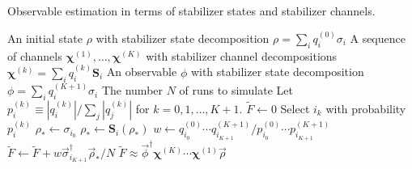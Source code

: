 \documentclass[twocolumn,pra]{revtex4}
\newcommand{\bs}[1]{\boldsymbol{#1}}
\begin{document}
\begin{algorithm}
\caption{Observable estimation in terms of stabilizer states and stabilizer channels.}
\label{alg:simulation algorithm}
\begin{algorithmic}
\Require An initial state $\rho$ with stabilizer state decomposition $\rho=\sum_{i} q_{i}^{(0)} \sigma_{i}$
\Require A sequence of channels $\bs{\chi}^{(1)}, \ldots, \bs{\chi}^{(K)}$  with stabilizer channel decompositions $\bs{\chi}^{(k)}=\sum_{i} q_{i}^{(k)}\mathbf{S}_{i}$
\Require An observable $\phi$ with stabilizer state decomposition $\phi=\sum_{i} q_{i}^{(K+1)} \sigma_{i}$
\Require The number $N$ of runs to simulate
\State Let $p^{(k)}_i \equiv | q^{(k)}_i|/ \sum_j | q^{(k)}_j|$ for $k=0,1,\ldots,K+1$.
\State  $\tilde{F} \leftarrow 0$
		\State Select $i_k$ with probability $p^{(k)}_i$
	\EndFor
	\State $\rho_{*} \leftarrow \sigma_{i_0}$
		\State $\rho_{*} \leftarrow \bs{S}_i(\rho_{*})$
	\EndFor
	\State $w \leftarrow  q^{(0)}_{i_0} \cdots  q^{(K+1)}_{i_{K+1}} / p^{(0)}_{i_0} \cdots p^{(K+1)}_{i_{K+1}}$
	\State $\tilde{F} \leftarrow \tilde{F} + w \vec{\sigma}_{i_{K+1}}^\dagger \vec{\rho}_{*} / N$
\EndFor
\Ensure $\tilde{F} \approx \vec{\phi}^\dagger \bs{\chi}^{(K)} \cdots \bs{\chi}^{(1)} \vec{\rho}$
\end{algorithmic}
\end{algorithm}
\end{document}
